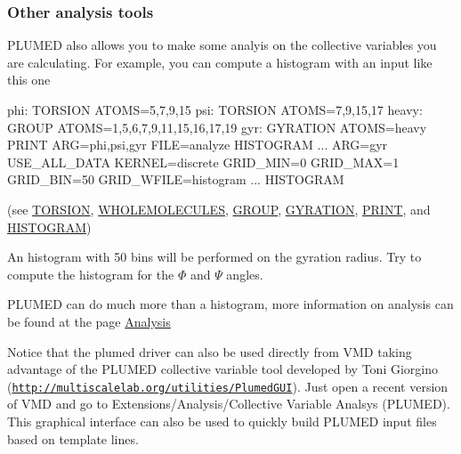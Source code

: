  \hypertarget{munster_munster-monitor-an}{}\subsubsection{Other analysis tools}\label{munster_munster-monitor-an}
P\+L\+U\+M\+E\+D also allows you to make some analyis on the collective variables you are calculating. For example, you can compute a histogram with an input like this one \begin{DoxyVerb}phi: TORSION ATOMS=5,7,9,15
psi: TORSION ATOMS=7,9,15,17
heavy: GROUP ATOMS=1,5,6,7,9,11,15,16,17,19
gyr: GYRATION ATOMS=heavy
PRINT ARG=phi,psi,gyr FILE=analyze
HISTOGRAM ...
  ARG=gyr
  USE_ALL_DATA
  KERNEL=discrete
  GRID_MIN=0
  GRID_MAX=1
  GRID_BIN=50
  GRID_WFILE=histogram
... HISTOGRAM
\end{DoxyVerb}
 (see \hyperlink{TORSION}{T\+O\+R\+S\+I\+O\+N}, \hyperlink{WHOLEMOLECULES}{W\+H\+O\+L\+E\+M\+O\+L\+E\+C\+U\+L\+E\+S}, \hyperlink{GROUP}{G\+R\+O\+U\+P}, \hyperlink{GYRATION}{G\+Y\+R\+A\+T\+I\+O\+N}, \hyperlink{PRINT}{P\+R\+I\+N\+T}, and \hyperlink{HISTOGRAM}{H\+I\+S\+T\+O\+G\+R\+A\+M})

An histogram with 50 bins will be performed on the gyration radius. Try to compute the histogram for the $\Phi$ and $\Psi$ angles.

P\+L\+U\+M\+E\+D can do much more than a histogram, more information on analysis can be found at the page \hyperlink{_analysis}{Analysis}

Notice that the plumed driver can also be used directly from V\+M\+D taking advantage of the P\+L\+U\+M\+E\+D collective variable tool developed by Toni Giorgino (\href{http://multiscalelab.org/utilities/PlumedGUI}{\tt http\+://multiscalelab.\+org/utilities/\+Plumed\+G\+U\+I}). Just open a recent version of V\+M\+D and go to Extensions/\+Analysis/\+Collective Variable Analsys (P\+L\+U\+M\+E\+D). This graphical interface can also be used to quickly build P\+L\+U\+M\+E\+D input files based on template lines.

